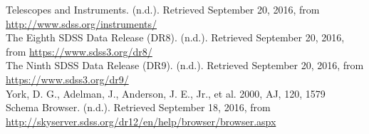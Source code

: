 \documentclass[10pt,letterpaper]{article}
\begin{document}
\begin{thebibliography}{1}
 Telescopes and Instruments. (n.d.). Retrieved September 20, 2016, from \url{http://www.sdss.org/instruments/}\\

 The Eighth SDSS Data Release (DR8). (n.d.). Retrieved September 20, 2016, from \url{https://www.sdss3.org/dr8/}\\

 The Ninth SDSS Data Release (DR9). (n.d.). Retrieved September 20, 2016, from \url{https://www.sdss3.org/dr9/}\\

 York, D. G., Adelman, J., Anderson, J. E., Jr., et al. 2000, AJ, 120, 1579\\

 Schema Browser. (n.d.). Retrieved September 18, 2016, from \url{http://skyserver.sdss.org/dr12/en/help/browser/browser.aspx}\\

\end{thebibliography}
\end{document}
